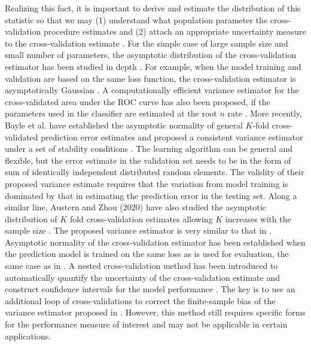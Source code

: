 \documentclass[12pt]{article}
\begin{document}
Realizing this fact, it is important to derive and estimate the distribution of this statistic so that we may (1) understand what population parameter the cross-validation procedure estimates and (2) attach an appropriate uncertainty measure to the cross-validation estimate \cite{bayle2020cross, lei2020cross, yousef2021estimating}.  For the simple case of large sample size and small number of parameters,  the asymptotic distribution of the cross-validation estimator has been studied in depth \cite{dudoit2005asymptotics, tian2007model, jiang2008estimating, ledell2015computationally}.  For example, when the model training and validation are based on the same loss function, the cross-validation estimator is asymptotically Gaussian \cite{dudoit2005asymptotics}.  A computationally efficient variance estimator for the cross-validated area under the ROC curve has also been proposed, if the parameters used in the classifier are estimated at the root $n$ rate  \cite{ledell2015computationally}. More recently,  Bayle et al. have established the asymptotic normality of general $K$-fold cross-validated prediction error estimates and proposed a consistent variance estimator under a set of stability conditions \cite{bayle2020cross}. The learning algorithm can be general and flexible, but the error estimate in the validation set needs to be in the form of sum of identically independent distributed random elements. The validity of their proposed variance estimate requires that the variation from model training is dominated by that in estimating the prediction error in the testing set.  Along a similar line, Austern and Zhou (2020) have also studied the asymptotic distribution of $K$ fold cross-validation estimates allowing $K$ increases with the sample size \cite{austern2020asymptotics}.  The proposed variance estimator is very similar to that in \cite{bayle2020cross}. Asymptotic normality of the cross-validation estimator has been established when the prediction model is trained on the same loss as is used for evaluation, the same case as in \cite{dudoit2005asymptotics}. A nested cross-validation method has been introduced to automatically quantify the uncertainty of the cross-validation estimate and construct confidence intervals for the model performance \cite{bates2021cross}. The key is to use an additional loop of cross-validations to correct the finite-sample bias of the variance estimator proposed in \cite{bayle2020cross, austern2020asymptotics}. However, this method still requires specific forms for the performance measure of interest and may not be applicable in certain applications.
\end{document}
